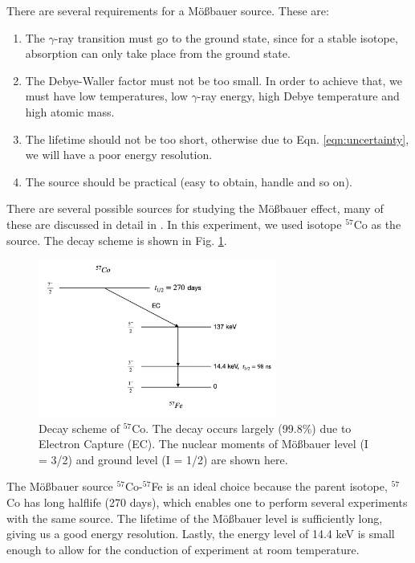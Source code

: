 \documentclass[a4paper]{report}
\numberwithin{equation}{section}
\begin{document}
There are several requirements for a M\"o{\ss}bauer source. These are: 

\begin{enumerate}
		\item The $\gamma$-ray transition must go to the ground state, since for a stable isotope, absorption can only take place from the ground state.
		\item The Debye-Waller factor must not be too small. In order to achieve that, we must have low temperatures, low $\gamma$-ray energy, high Debye temperature and high atomic mass.
		\item The lifetime should not be too short, otherwise due to Eqn. \ref{eqn:uncertainty}, we will have a poor energy resolution.
		\item The source should be practical (easy to obtain, handle and so on).
\end{enumerate}

There are several possible sources for studying the M\"o{\ss}bauer effect, many of these are discussed in detail in \cite{Schatz1996}. In this experiment, we used isotope $^{57}$Co as the source. The decay scheme is shown in Fig. \ref{fig:decay}.

\begin{figure}[htpb]
    \centering
    \includegraphics[width=0.7\textwidth]{source}
    \caption{Decay scheme of $^{57}$Co. The decay occurs largely (99.8\%) due to Electron Capture (EC). The nuclear moments of M\"o{\ss}bauer level (I = 3/2) and ground level (I = 1/2) are shown here.}
    \label{fig:decay}
\end{figure}	

The M\"o{\ss}bauer source $^{57}$Co-$^{57}$Fe is an ideal choice because the parent isotope, $^{57}$Co has long halflife (270 days), which enables one to perform several experiments with the same source. The lifetime of the M\"o{\ss}bauer level is sufficiently long, giving us a good energy resolution. Lastly, the energy level of 14.4 keV is small enough to allow for the conduction of experiment at room temperature. 
\end{document}

